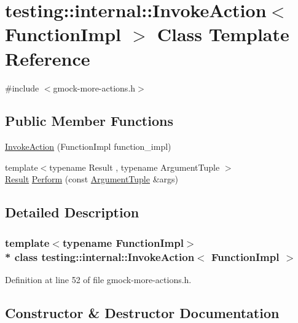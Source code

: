\hypertarget{classtesting_1_1internal_1_1_invoke_action}{}\section{testing\+:\+:internal\+:\+:Invoke\+Action$<$ Function\+Impl $>$ Class Template Reference}
\label{classtesting_1_1internal_1_1_invoke_action}


{\ttfamily \#include $<$gmock-\/more-\/actions.\+h$>$}

\subsection*{Public Member Functions}
\begin{DoxyCompactItemize}
\item 
\hyperlink{classtesting_1_1internal_1_1_invoke_action_a786ce772624fc87a31891f465df7ce61}{Invoke\+Action} (Function\+Impl function\+\_\+impl)
\item 
{\footnotesize template$<$typename Result , typename Argument\+Tuple $>$ }\\\hyperlink{typedefs__d_8js_a28287671eaf7406afd604bd055ba4066}{Result} \hyperlink{classtesting_1_1internal_1_1_invoke_action_af357ce691795b3520de1fda4ab8af8b2}{Perform} (const \hyperlink{typedefs__d_8js_a396b2bdc7ef45f482a7e9254b15c3c01}{Argument\+Tuple} \&args)
\end{DoxyCompactItemize}


\subsection{Detailed Description}
\subsubsection*{template$<$typename Function\+Impl$>$\\*
class testing\+::internal\+::\+Invoke\+Action$<$ Function\+Impl $>$}



Definition at line 52 of file gmock-\/more-\/actions.\+h.



\subsection{Constructor \& Destructor Documentation}
